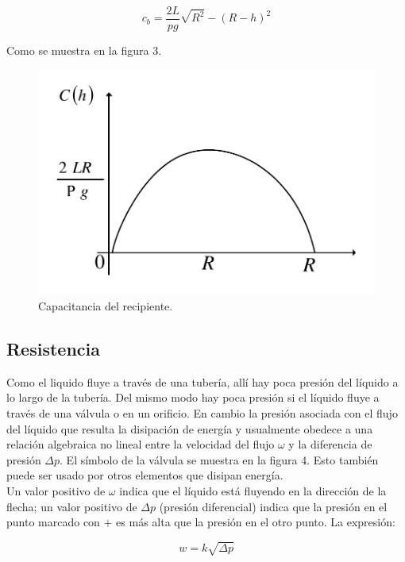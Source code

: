 \documentclass[a4paper,12pt,twoside]{proyectotanquesecci}
\begin{document}
\begin{equation}
c_{b}=\frac{2L}{pg}\sqrt{R^{2}}-(R-h)^{2}
\label{Ecu 4}
\end{equation}

Como se muestra en la figura 3.

\begin{figure}[h]
\centering
\includegraphics[scale=0.5]{Figura3}
\renewcommand{\figurename}{Fig.}
\caption{Capacitancia del recipiente.}
\label{Capacitancia del recipiente.}
\end{figure}

\subsection{Resistencia}

Como el liquido fluye a través de una tubería, allí hay poca presión del líquido a lo largo de la tubería. Del mismo modo hay poca presión si el líquido fluye a través de una válvula o en un orificio. En cambio la presión asociada con el flujo del líquido que resulta la disipación de energía y usualmente obedece a una relación algebraica no lineal entre la velocidad del flujo $\omega$ y la diferencia de presión $\Delta p$. El símbolo de la válvula se muestra en la figura 4. Esto también puede ser usado por otros elementos que disipan energía. \\

Un valor positivo de $\omega$ indica que el líquido está fluyendo en la dirección de la flecha; un valor positivo de $\Delta p$ (presión diferencial) indica que la presión en el punto marcado con $+$ es más alta que la presión en el otro punto. La expresión:

\begin{equation}
w=k\sqrt{\Delta p}
\label{Ecu 7}
\end{equation}
\end{document}
